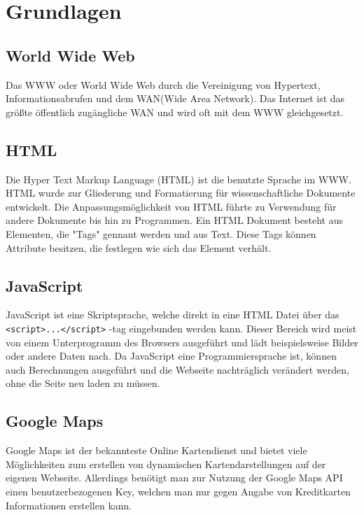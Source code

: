 \documentclass[a4paper, 12pt]{scrreprt}
\begin{document}
\chapter{Grundlagen}
\section{World Wide Web}
Das WWW oder World Wide Web\cite{berners1992world} durch die Vereinigung von Hypertext, Informationsabrufen und dem WAN(Wide Area Network).
Das Internet ist das größte öffentlich zugängliche WAN und wird oft mit dem WWW gleichgesetzt.
\section{HTML}
Die Hyper Text Markup Language (HTML) ist die benutzte Sprache im WWW.
HTML wurde zur Gliederung und Formatierung für wissenschaftliche Dokumente entwickelt.
Die Anpassungsmöglichkeit von HTML führte zu Verwendung für andere Dokumente bis hin zu Programmen.
Ein HTML Dokument besteht aus Elementen, die "Tags" gennant werden und aus Text.
Diese Tags können Attribute besitzen, die festlegen wie sich das Element verhält.\cite{htmlspec}
\section{JavaScript}
JavaScript ist eine Skriptsprache, welche direkt in eine HTML Datei über das \verb+<script>...</script>+ -tag eingebunden werden kann.
Dieser Bereich wird meist von einem Unterprogramm des Browsers ausgeführt und lädt beispielsweise Bilder oder andere Daten nach.
Da JavaScript eine Programmiersprache ist, können auch Berechnungen ausgeführt und die Webseite nachträglich verändert werden, ohne die Seite neu laden zu müssen.\cite{javascriptreferenz}
\section{Google Maps}
Google Maps\cite{gmaps} ist der bekannteste Online Kartendienst und bietet viele Möglichkeiten zum erstellen von dynamischen Kartendarstellungen auf der eigenen Webseite.
Allerdings benötigt man zur Nutzung der Google Maps API\cite{gmapsapi} einen benutzerbezogenen Key, welchen man nur gegen Angabe von Kreditkarten Informationen erstellen kann.
\end{document}
